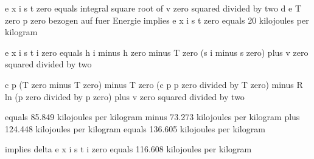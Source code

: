 e x i s t zero equals integral square root of v zero squared divided by two d e T zero p zero bezogen auf fuer Energie implies e x i s t zero equals 20 kilojoules per kilogram

e x i s t i zero equals h i minus h zero minus T zero (s i minus s zero) plus v zero squared divided by two

c p (T zero minus T zero) minus T zero (c p p zero divided by T zero) minus R ln (p zero divided by p zero) plus v zero squared divided by two

equals 85.849 kilojoules per kilogram minus 73.273 kilojoules per kilogram plus 124.448 kilojoules per kilogram equals 136.605 kilojoules per kilogram

implies delta e x i s t i zero equals 116.608 kilojoules per kilogram